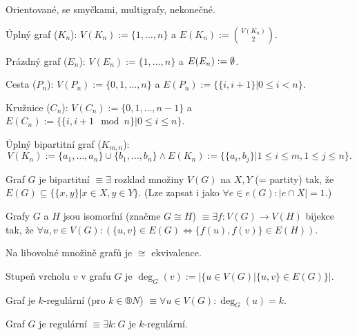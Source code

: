 \documentclass[12pt]{article}					%
\begin{document}
    \begin{poznamka}[Rozšíření]
        Orientované, se smyčkami, multigrafy, nekonečné.
    \end{poznamka}

    \begin{priklady}
        Úplný graf ($K_n$): $V(K_n) := \{1, …, n\}$ a $E(K_n) := \binom{V(K_n)}{2}$.

        Prázdný graf ($E_n$): $V(E_n) := \{1, …, n\}$ a $E(E_n) := \emptyset$.

        Cesta ($P_n$): $V(P_n) := \{0, 1, …, n\}$ a $E(P_n) := \{\{i, i+1\}|0≤i<n\}$.
        
        Kružnice ($C_n$): $V(C_n) := \{0, 1, …, n-1\}$ a $E(C_n) := \{\{i, i+1 \mod n\}|0≤i≤n\}$.

        Úplný bipartitní graf ($K_{m, n}$):
        $$ V(K_n) := \{a_1, …, a_n\} \cup \{b_1, …, b_n\} \land E(K_n) := \{\{a_i, b_j\}|1≤i≤m, 1≤j≤n\}. $$
    \end{priklady}

    \begin{definice}
        Graf $G$ je bipartitní $≡ \exists$ rozklad množiny $V(G)$ na $X, Y$ (= partity) tak, že $E(G) \subseteq \{\{x, y\} | x\in X, y \in Y\}$. (Lze zapsat i jako $\forall e \in e(G): |e\cap X| = 1$.)
    \end{definice}

    \begin{definice}
        Grafy $G$ a $H$ jsou isomorfní (značme $G \cong H$) $≡ \exists f: V(G) \rightarrow V(H)$ bijekce tak, že $\forall u, v \in V(G):(\{u, v\} \in E(G) \Leftrightarrow \{f(u), f(v)\} \in E(H))$.
    \end{definice}

    \begin{poznamka}[K nahlédnutí]
        Na libovolné množině grafů je $\cong$ ekvivalence.
    \end{poznamka}

    \begin{definice}
        Stupeň vrcholu $v$ v grafu $G$ je $\deg_G(v) := \left|\{u \in V(G)|\{u, v\} \in E(G)\}\right|$.
    \end{definice}

    \begin{definice}
        Graf je $k$-regulární (pro $k \in ®N$) $≡ \forall u \in V(G): \deg_G(u) = k$.

        Graf $G$ je regulární $≡ \exists k: G$ je $k$-regulární.
    \end{definice}
\end{document}
